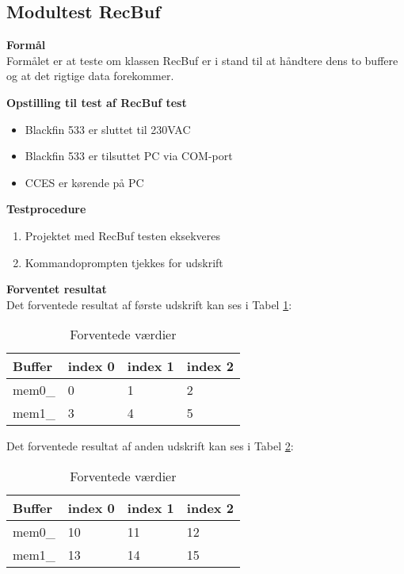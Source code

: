 \subsection{Modultest RecBuf}

\textbf{Formål} \\
Formålet er at teste om klassen RecBuf er i stand til at håndtere dens to buffere og at det rigtige data forekommer. 

\textbf{Opstilling til test af RecBuf test}

\begin{itemize}
	\item Blackfin 533 er sluttet til 230VAC
	\item Blackfin 533 er tilsuttet PC via COM-port
	\item CCES er kørende på PC
\end{itemize}

\textbf{Testprocedure}
\begin{enumerate}
	\item Projektet med RecBuf testen eksekveres 
	\item Kommandoprompten tjekkes for udskrift 
\end{enumerate}

\textbf{Forventet resultat} \\
Det forventede resultat af første udskrift kan ses i Tabel \ref{IL:modultest:values1}:

\begin{table}[H]
	\caption{Forventede værdier }
\begin{center}
    \begin{tabular}{ | l | l | l | l |}
    \hline 
    \textbf{Buffer} 	& \textbf{index 0}  &\textbf{index 1}	&\textbf{index 2}  	\\ \hline
     mem0\_	 	& 0   				& 1				& 2			\\ \hline
     mem1\_ 	& 3  				& 4 			& 5				\\ \hline
    \end{tabular}
\end{center}
	\label{IL:modultest:values1}
\end{table}

Det forventede resultat af anden udskrift kan ses i Tabel \ref{IL:modultest:values2}:

\begin{table}[H]
	\caption{Forventede værdier }
\begin{center}
    \begin{tabular}{ | l | l | l | l |}
    \hline 
    \textbf{Buffer} 	& \textbf{index 0}  &\textbf{index 1}	&\textbf{index 2}  	\\ \hline
     mem0\_	 	& 10   				& 11				& 12			\\ \hline
     mem1\_ 	& 13  				& 14 			& 15				\\ \hline
    \end{tabular}
\end{center}
	\label{IL:modultest:values2}
\end{table}

